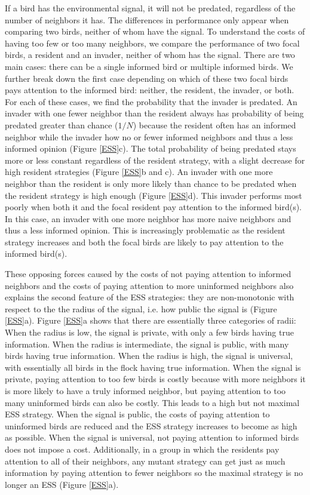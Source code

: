 \documentclass{article}
\begin{document}
If a bird has the environmental signal, it will not be predated, regardless of the number of neighbors it has. The differences in performance only appear when comparing two birds, neither of whom have the signal. To understand the costs of having too few or too many neighbors, we compare the performance of two focal birds, a resident and an invader, neither of whom has the signal.  There are two main cases: there can be a single informed bird or multiple informed birds. We further break down the first case depending on which of these two focal birds pays attention to the informed bird: neither, the resident, the invader, or both. For each of these cases, we find the probability that the invader is predated. An invader with one fewer neighbor than the resident always has probability of being predated greater than chance ($1/N$) because the resident often has an informed neighbor while the invader how no or fewer informed neighbors and thus a less informed opinion (Figure \ref{ESS}c). The total probability of being predated stays more or less constant regardless of the resident strategy, with a slight decrease for high resident strategies (Figure \ref{ESS}b and c). An invader with one more neighbor than the resident is only more likely than chance to be predated when the resident strategy is high enough  (Figure \ref{ESS}d). This invader performs most poorly when both it and the focal resident pay attention to the informed bird(s). In this case, an invader with one more neighbor has more naive neighbors and thus a less informed opinion. This is increasingly problematic as the resident strategy increases and both the focal birds are likely to pay attention to the informed bird(s).

These opposing forces caused by the costs of not paying attention to informed neighbors  and the costs of paying attention to more uninformed neighbors  also explains the second feature of the ESS strategies: they are non-monotonic with respect to the the radius of the signal, i.e. how public the signal is (Figure \ref{ESS}a). Figure \ref{ESS}a shows that there are essentially three categories of radii: When the radius is low, the signal is private, with only a few birds having true information. When the radius is intermediate, the signal is public, with many birds having true information. When the radius is high, the signal is universal, with essentially all birds in the flock having true information. When the signal is private, paying attention to too few birds is costly because with more neighbors it is more likely to have a truly informed neighbor, but paying attention to too many uninformed birds can also be costly. This leads to a high but not maximal ESS strategy. When the signal is public, the costs of paying attention to uninformed birds are reduced and the ESS strategy increases to become as high as possible. When the signal is universal, not paying attention to informed birds does not impose a cost. Additionally, in a group in which the residents pay attention to all of their neighbors, any mutant strategy can get just as much information by paying attention to fewer neighbors so the maximal strategy is no longer an ESS (Figure \ref{ESS}a).
\end{document}
